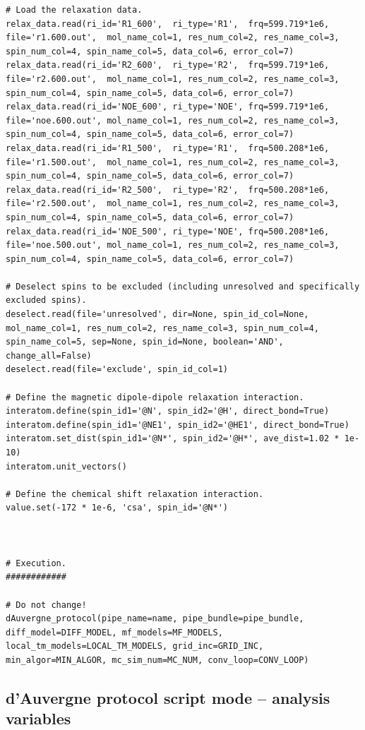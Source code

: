 \begin{htmlonly}
\begin{htmlonly}
\begin{lstlisting}
# Load the relaxation data.
relax_data.read(ri_id='R1_600',  ri_type='R1',  frq=599.719*1e6, file='r1.600.out',  mol_name_col=1, res_num_col=2, res_name_col=3, spin_num_col=4, spin_name_col=5, data_col=6, error_col=7)
relax_data.read(ri_id='R2_600',  ri_type='R2',  frq=599.719*1e6, file='r2.600.out',  mol_name_col=1, res_num_col=2, res_name_col=3, spin_num_col=4, spin_name_col=5, data_col=6, error_col=7)
relax_data.read(ri_id='NOE_600', ri_type='NOE', frq=599.719*1e6, file='noe.600.out', mol_name_col=1, res_num_col=2, res_name_col=3, spin_num_col=4, spin_name_col=5, data_col=6, error_col=7)
relax_data.read(ri_id='R1_500',  ri_type='R1',  frq=500.208*1e6, file='r1.500.out',  mol_name_col=1, res_num_col=2, res_name_col=3, spin_num_col=4, spin_name_col=5, data_col=6, error_col=7)
relax_data.read(ri_id='R2_500',  ri_type='R2',  frq=500.208*1e6, file='r2.500.out',  mol_name_col=1, res_num_col=2, res_name_col=3, spin_num_col=4, spin_name_col=5, data_col=6, error_col=7)
relax_data.read(ri_id='NOE_500', ri_type='NOE', frq=500.208*1e6, file='noe.500.out', mol_name_col=1, res_num_col=2, res_name_col=3, spin_num_col=4, spin_name_col=5, data_col=6, error_col=7)

# Deselect spins to be excluded (including unresolved and specifically excluded spins).
deselect.read(file='unresolved', dir=None, spin_id_col=None, mol_name_col=1, res_num_col=2, res_name_col=3, spin_num_col=4, spin_name_col=5, sep=None, spin_id=None, boolean='AND', change_all=False)
deselect.read(file='exclude', spin_id_col=1)

# Define the magnetic dipole-dipole relaxation interaction.
interatom.define(spin_id1='@N', spin_id2='@H', direct_bond=True)
interatom.define(spin_id1='@NE1', spin_id2='@HE1', direct_bond=True)
interatom.set_dist(spin_id1='@N*', spin_id2='@H*', ave_dist=1.02 * 1e-10)
interatom.unit_vectors()

# Define the chemical shift relaxation interaction.
value.set(-172 * 1e-6, 'csa', spin_id='@N*')



# Execution.
############

# Do not change!
dAuvergne_protocol(pipe_name=name, pipe_bundle=pipe_bundle, diff_model=DIFF_MODEL, mf_models=MF_MODELS, local_tm_models=LOCAL_TM_MODELS, grid_inc=GRID_INC, min_algor=MIN_ALGOR, mc_sim_num=MC_NUM, conv_loop=CONV_LOOP)
\end{lstlisting}



\subsection{d'Auvergne protocol script mode -- analysis variables} \label{sect: d'Auvergne protocol script variables}


\end{htmlonly}
\end{htmlonly}
